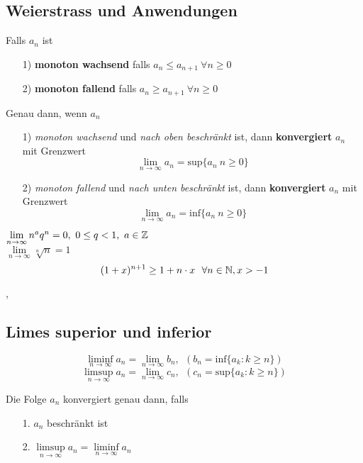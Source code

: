 \subsection{Weierstrass und Anwendungen}

\Def[2.2.1] Falls  $a_{n}$ ist
\begin{enumerate}
\item[1)] \textbf{monoton wachsend}  falls ${a_{n} \leq a_{n + 1} \ \forall n \geq 0}$
\item[2)] \textbf{monoton fallend} falls ${a_{n} \geq a_{n + 1} \ \forall n \geq 0}$
\end{enumerate}

\Satz[2.2.2 (Weierstrass)] Genau dann, wenn $a_{n}$ 
\begin{enumerate}
\item[1)] \textit{monoton wachsend} und \textit{nach oben beschränkt} ist, dann \textbf{konvergiert} $a_{n}$ mit Grenzwert
\[ 
\lim\limits_{n \rightarrow \infty} a_{n} = \text{sup}\{a_{n} \: n \geq 0\}
\]
\item[2)] \textit{monoton fallend} und \textit{nach unten beschränkt} ist, dann \textbf{konvergiert} $a_{n}$ mit Grenzwert
\[ 
\lim\limits_{n \rightarrow \infty} a_{n} = \text{inf}\{a_{n} \: n \geq 0\}
\]
\end{enumerate}
\Bsp[2.2.3] $\lim\limits_{n \rightarrow \infty} n^{a}q^{n} = 0, \ 0 \leq q < 1, \ a \in \mathbb{Z}$ \\
\Bsp[2.2.5] $\lim\limits_{n \rightarrow \infty} \sqrt[n]{n} = 1$ \\
\[
(1 + x)^{n+1} \geq 1 + n \cdot x \ \ \forall n \in \N, x > -1
\] 

\sep

\subsection{Limes superior und inferior}

\Def[2.3.0]
\[
\liminf\limits_{n \rightarrow \infty} a_{n} = \lim\limits_{n \rightarrow \infty} b_{n}, \ \ (b_{n} = \text{inf} \{a_{k} : k \geq n \})
\]
\[
\limsup\limits_{n \rightarrow \infty} a_{n} = \lim\limits_{n \rightarrow \infty} c_{n}, \ \ (c_{n} = \text{sup} \{a_{k} : k \geq n \})
\]

\Lemma[2.4.1] Die Folge $a_{n}$ konvergiert genau dann, falls
\begin{enumerate}
\item[1.] $a_{n}$ beschränkt ist
\item[2.] $\limsup\limits_{n \rightarrow \infty} a_{n} = \liminf\limits_{n \rightarrow \infty} a_{n}$
\end{enumerate}

